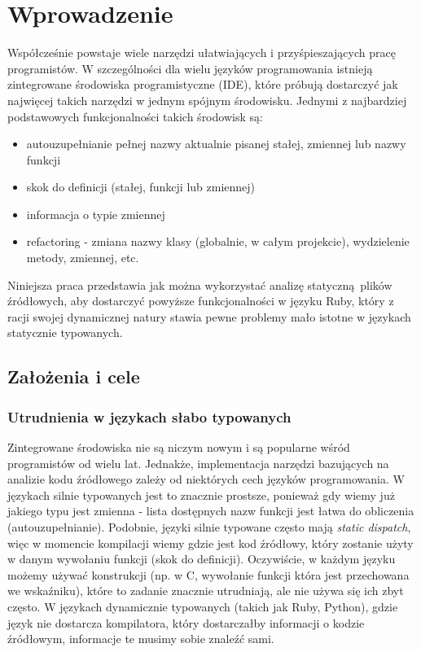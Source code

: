 \documentclass[declaration,shortabstract]{iithesis}
\author         {Rafał Łasocha}
\begin{document}
\chapter{Wprowadzenie}

Współcześnie powstaje wiele narzędzi ułatwiających i przyśpieszających pracę programistów.
W szczególności dla wielu języków programowania istnieją zintegrowane środowiska programistyczne (IDE), które próbują dostarczyć jak najwięcej takich narzędzi w jednym spójnym środowisku. Jednymi z najbardziej podstawowych funkcjonalności takich środowisk są:

\begin{itemize}
\item autouzupełnianie pełnej nazwy aktualnie pisanej stałej, zmiennej lub nazwy funkcji
\item skok do definicji (stałej, funkcji lub zmiennej)
\item informacja o typie zmiennej
\item refactoring - zmiana nazwy klasy (globalnie, w całym projekcie), wydzielenie metody, zmiennej, etc.
\end{itemize}

Niniejsza praca przedstawia jak można wykorzystać analizę statyczną plików źródłowych, aby dostarczyć powyższe funkcjonalności w języku Ruby, który z racji swojej dynamicznej natury stawia pewne problemy mało istotne w językach statycznie typowanych.

\section{Założenia i cele}

\subsection{Utrudnienia w językach słabo typowanych}

Zintegrowane środowiska nie są niczym nowym i są popularne wśród programistów od wielu lat.
Jednakże, implementacja narzędzi bazujących na analizie kodu źródłowego zależy od niektórych cech języków programowania.
W językach silnie typowanych jest to znacznie prostsze, ponieważ gdy wiemy już jakiego typu jest zmienna - lista dostępnych nazw funkcji jest łatwa do obliczenia (autouzupełnianie).
Podobnie, języki silnie typowane często mają \textit{static dispatch}, więc w momencie kompilacji wiemy gdzie jest kod źródłowy, który zostanie użyty w danym wywołaniu funkcji (skok do definicji).
Oczywiście, w każdym języku możemy używać konstrukcji (np. w C, wywołanie funkcji która jest przechowana we wskaźniku), które to zadanie znacznie utrudniają, ale nie używa się ich zbyt często.
W językach dynamicznie typowanych (takich jak Ruby, Python), gdzie język nie dostarcza kompilatora, który dostarczałby informacji o kodzie źródłowym, informacje te musimy sobie znaleźć sami.
\end{document}
